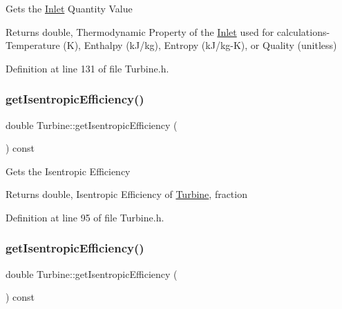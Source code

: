 Gets the \hyperlink{class_inlet}{Inlet} Quantity Value

\begin{DoxyReturn}{Returns}
double, Thermodynamic Property of the \hyperlink{class_inlet}{Inlet} used for calculations-\/ Temperature (K), Enthalpy (k\+J/kg), Entropy (k\+J/kg-\/K), or Quality (unitless) 
\end{DoxyReturn}


Definition at line 131 of file Turbine.\+h.

\mbox{\label{class_turbine_a5d907859de4acc153a32bd443238b445}} 
\subsubsection{\texorpdfstring{get\+Isentropic\+Efficiency()}{getIsentropicEfficiency()}\hspace{0.1cm}{\footnotesize\ttfamily [1/3]}}
{\footnotesize\ttfamily double Turbine\+::get\+Isentropic\+Efficiency (\begin{DoxyParamCaption}{ }\end{DoxyParamCaption}) const\hspace{0.3cm}{\ttfamily [inline]}}

Gets the Isentropic Efficiency

\begin{DoxyReturn}{Returns}
double, Isentropic Efficiency of \hyperlink{class_turbine}{Turbine}, fraction 
\end{DoxyReturn}


Definition at line 95 of file Turbine.\+h.

\mbox{\label{class_turbine_a5d907859de4acc153a32bd443238b445}} 
\subsubsection{\texorpdfstring{get\+Isentropic\+Efficiency()}{getIsentropicEfficiency()}\hspace{0.1cm}{\footnotesize\ttfamily [2/3]}}
{\footnotesize\ttfamily double Turbine\+::get\+Isentropic\+Efficiency (\begin{DoxyParamCaption}{ }\end{DoxyParamCaption}) const\hspace{0.3cm}{\ttfamily [inline]}}


